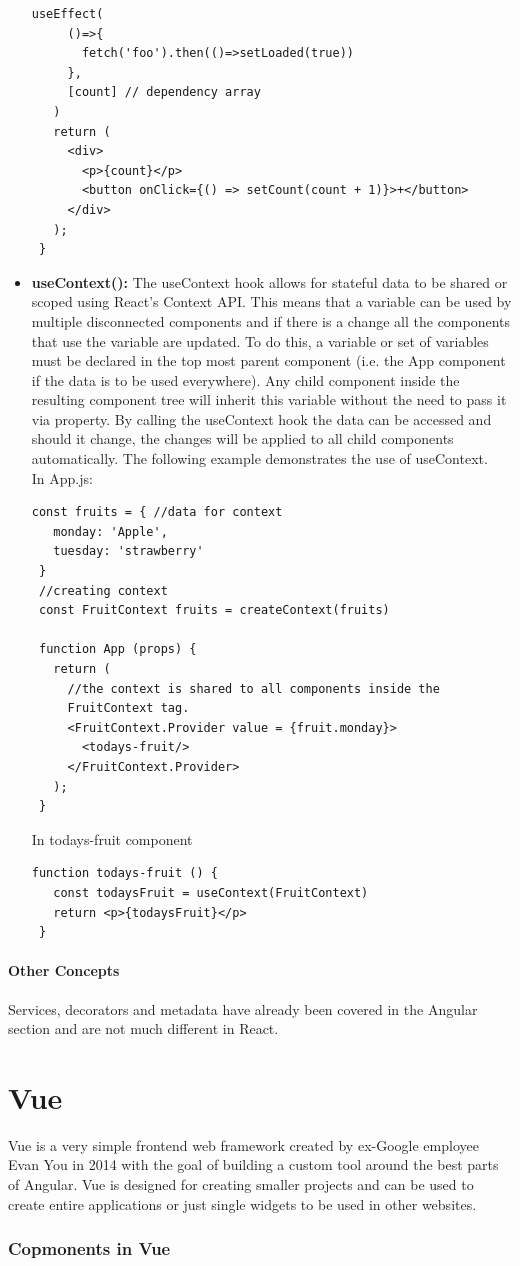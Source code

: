 \begin{itemize}
\begin{Verbatim}[frame=single]
   useEffect(
     ()=>{
       fetch('foo').then(()=>setLoaded(true))
     },
     [count] // dependency array
   )
   return (
     <div>
       <p>{count}</p>		            
       <button onClick={() => setCount(count + 1)}>+</button>
     </div>
   );
 }
\end{Verbatim}
\pagebreak
\item \textbf{useContext():} The useContext hook allows for stateful data to be shared or scoped using React's Context API. This means that a variable can be used by multiple disconnected components and if there is a change all the components that use the variable are updated. To do this, a variable or set of variables must be declared in the top most parent component (i.e. the App component if the data is to be used everywhere). Any child component inside the resulting component tree will inherit this variable without the need to pass it via property. By calling the useContext hook the data can be accessed and should it change, the changes will be applied to all child components automatically. The following example demonstrates the use of useContext.\\[0.5cm]
In App.js:
\begin{Verbatim}[frame=single]
 const fruits = { //data for context
   monday: 'Apple',
   tuesday: 'strawberry'
 }
 //creating context
 const FruitContext fruits = createContext(fruits)

 function App (props) {
   return (
     //the context is shared to all components inside the
     FruitContext tag.
     <FruitContext.Provider value = {fruit.monday}>
       <todays-fruit/>
     </FruitContext.Provider>
   );  
 }
\end{Verbatim}
In todays-fruit component
\begin{Verbatim}[frame=single]
 function todays-fruit () {
   const todaysFruit = useContext(FruitContext)
   return <p>{todaysFruit}</p>
 }
\end{Verbatim}
\end{itemize}

\subsubsection{Other Concepts}
Services, decorators and metadata have already been covered in the Angular section and are not much different in React.
\chapter{Vue}
Vue is a very simple frontend web framework created by ex-Google employee Evan You in 2014 with the goal of building a custom tool around the best parts of Angular. Vue is designed for creating smaller projects and can be used to create entire applications or just single widgets to be used in other websites.
\subsection{Copmonents in Vue}







